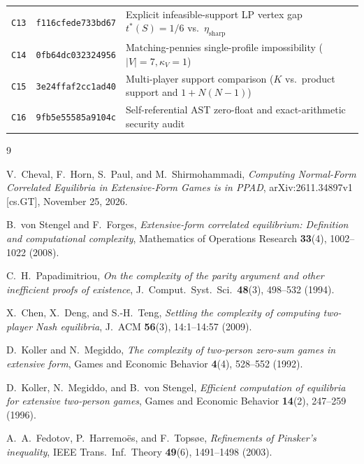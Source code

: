 \documentclass[11pt,a4paper]{article}
\theoremstyle{remark}
\begin{document}
\begin{table}[htbp]
\begin{tabular}{@{}cll@{}}
\texttt{C13} & \texttt{f116cfede733bd67} & Explicit infeasible-support LP vertex gap $t^*(S)=1/6$ vs.\ $\eta_{\mathrm{sharp}}$ \\
\texttt{C14} & \texttt{0fb64dc032324956} & Matching-pennies single-profile impossibility ($|V|=7, \kappa_V=1$) \\
\texttt{C15} & \texttt{3e24ffaf2cc1ad40} & Multi-player support comparison ($K$ vs.\ product support and $1+N(N-1)$) \\
\texttt{C16} & \texttt{9fb5e55585a9104c} & Self-referential AST zero-float and exact-arithmetic security audit \\
\bottomrule
\end{tabular}
\end{table}

\begin{thebibliography}{9}

V.~Cheval, F.~Horn, S.~Paul, and M.~Shirmohammadi, \emph{Computing Normal-Form Correlated Equilibria in Extensive-Form Games is in PPAD}, arXiv:2611.34897v1 [cs.GT], November 25, 2026.

B.~von Stengel and F.~Forges, \emph{Extensive-form correlated equilibrium: Definition and computational complexity}, Mathematics of Operations Research \textbf{33}(4), 1002--1022 (2008).

C.~H.~Papadimitriou, \emph{On the complexity of the parity argument and other inefficient proofs of existence}, J.\ Comput.\ Syst.\ Sci.\ \textbf{48}(3), 498--532 (1994).

X.~Chen, X.~Deng, and S.-H.~Teng, \emph{Settling the complexity of computing two-player Nash equilibria}, J.\ ACM \textbf{56}(3), 14:1--14:57 (2009).

D.~Koller and N.~Megiddo, \emph{The complexity of two-person zero-sum games in extensive form}, Games and Economic Behavior \textbf{4}(4), 528--552 (1992).

D.~Koller, N.~Megiddo, and B.~von Stengel, \emph{Efficient computation of equilibria for extensive two-person games}, Games and Economic Behavior \textbf{14}(2), 247--259 (1996).

A.~A.~Fedotov, P.~Harremo\"es, and F.~Tops\o e, \emph{Refinements of Pinsker's inequality}, IEEE Trans.\ Inf.\ Theory \textbf{49}(6), 1491--1498 (2003).

\end{thebibliography}
\end{document}
